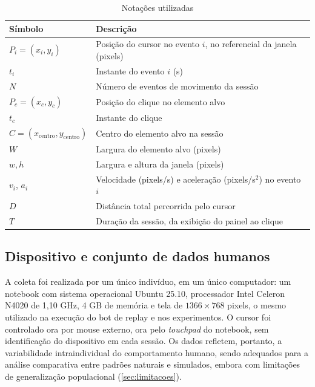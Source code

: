 \begin{table}[htb]
    \centering
    \caption{Notações utilizadas}
    \label{tab:notacoes}
    \begin{tabular}{ll}
        \hline
        Símbolo & Descrição \\
        \hline
        $P_i = (x_i, y_i)$ & Posição do cursor no evento $i$, no referencial da janela (pixels) \\
        $t_i$ & Instante do evento $i$ (s) \\
        $N$ & Número de eventos de movimento da sessão \\
        $P_c = (x_c, y_c)$ & Posição do clique no elemento alvo \\
        $t_c$ & Instante do clique \\
        $C = (x_{\text{centro}}, y_{\text{centro}})$ & Centro do elemento alvo na sessão \\
        $W$ & Largura do elemento alvo (pixels) \\
        $w, h$ & Largura e altura da janela (pixels) \\
        $v_i$, $a_i$ & Velocidade (pixels/s) e aceleração (pixels/s$^2$) no evento $i$ \\
        $D$ & Distância total percorrida pelo cursor \\
        $T$ & Duração da sessão, da exibição do painel ao clique \\
        \hline
    \end{tabular}
\end{table}

\subsection{Dispositivo e conjunto de dados humanos}

A coleta foi realizada por um único indivíduo, em um único computador: um notebook com sistema operacional Ubuntu 25.10, processador Intel Celeron N4020 de 1,10 GHz, 4 GB de memória e tela de $1366 \times 768$ pixels, o mesmo utilizado na execução do bot de replay e nos experimentos. O cursor foi controlado ora por mouse externo, ora pelo \textit{touchpad} do notebook, sem identificação do dispositivo em cada sessão. Os dados refletem, portanto, a variabilidade intraindividual do comportamento humano, sendo adequados para a análise comparativa entre padrões naturais e simulados, embora com limitações de generalização populacional (\autoref{sec:limitacoes}).

